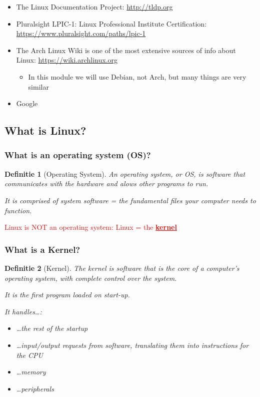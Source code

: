 \documentclass{article}
\newtheorem{theorem}{Definitie}[section]
\begin{document}
\begin{itemize}
    \item The Linux Documentation Project: \url{http://tldp.org}
    \item Pluralsight LPIC-1: Linux Professional Institute Certification: \url{https://www.pluralsight.com/paths/lpic-1}
    \item The Arch Linux Wiki is one of the most extensive sources of info about Linux: \url{https://wiki.archlinux.org}
    \begin{itemize}
        \item In this module we will use Debian, not Arch, but many things are very similar
    \end{itemize}
    \item Google
\end{itemize}

\subsection{What is Linux?}

\subsubsection{What is an operating system (OS)?}

\begin{theorem}[Operating System]
An operating system, or OS, is software that communicates with the hardware
and alows other programs to run. 

It is comprised of system software = the fundamental files your computer needs to function.
\end{theorem}


\textcolor{red}{Linux is NOT an operating system: Linux = the \underline{\textbf{kernel}}}

\subsubsection{What is a Kernel?}

\begin{theorem}[Kernel]
The kernel is software that is the core of a computer's operating system, with complete control over the system.

It is the first program loaded on start-up. 

It handles\dots: 

\begin{itemize}
    \item \dots the rest of the startup
    \item \dots input/output requests from software, translating them into instructions for the CPU
    \item \dots memory
    \item \dots peripherals
\end{itemize}
\end{theorem}
\end{document}
